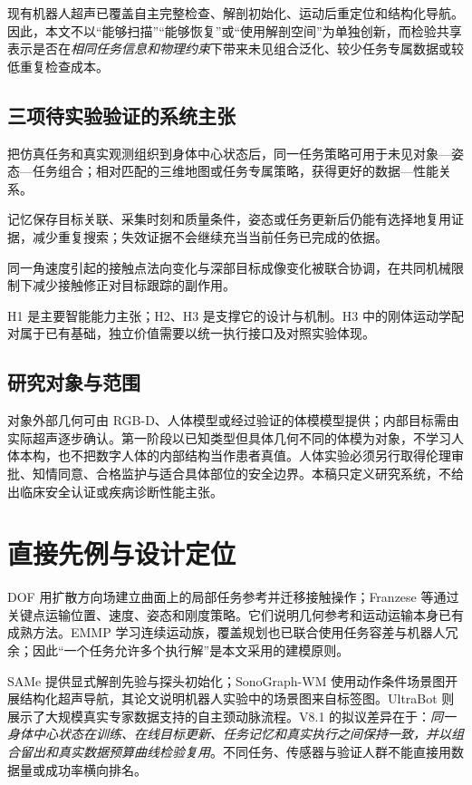 \documentclass[UTF8,11pt,a4paper,fontset=fandol]{ctexart}
\numberwithin{equation}{section}
\theoremstyle{definition}
\begin{document}
现有机器人超声已覆盖自主完整检查、解剖初始化、运动后重定位和结构化导航\cite{ultrabot,same,reposition,sonograph}。因此，本文不以“能够扫描”“能够恢复”或“使用解剖空间”为单独创新，而检验共享表示是否在\emph{相同任务信息和物理约束}下带来未见组合泛化、较少任务专属数据或较低重复检查成本。

\subsection{三项待实验验证的系统主张}
\begin{description}[style=nextline]
\item[H1：可迁移的共同接口。]
把仿真任务和真实观测组织到身体中心状态后，同一任务策略可用于未见对象—姿态—任务组合；相对匹配的三维地图或任务专属策略，获得更好的数据—性能关系。
\item[H2：可持续使用的对象证据。]
记忆保存目标关联、采集时刻和质量条件，姿态或任务更新后仍能有选择地复用证据，减少重复搜索；失效证据不会继续充当当前任务已完成的依据。
\item[H3：不牺牲目标成像的接触执行。]
同一角速度引起的接触点法向变化与深部目标成像变化被联合协调，在共同机械限制下减少接触修正对目标跟踪的副作用。
\end{description}
H1 是主要智能能力主张；H2、H3 是支撑它的设计与机制。H3 中的刚体运动学配对属于已有基础，独立价值需要以统一执行接口及对照实验体现。

\subsection{研究对象与范围}
对象外部几何可由 RGB-D、人体模型或经过验证的体模模型提供；内部目标需由实际超声逐步确认。第一阶段以已知类型但具体几何不同的体模为对象，不学习人体本构，也不把数字人体的内部结构当作患者真值。人体实验必须另行取得伦理审批、知情同意、合格监护与适合具体部位的安全边界。本稿只定义研究系统，不给出临床安全认证或疾病诊断性能主张。

\section{直接先例与设计定位}
\label{sec:related}
DOF 用扩散方向场建立曲面上的局部任务参考并迁移接触操作\cite{dof}；Franzese 等通过关键点运输位置、速度、姿态和刚度策略\cite{transport}。它们说明几何参考和运动运输本身已有成熟方法。EMMP 学习连续运动族，覆盖规划也已联合使用任务容差与机器人冗余\cite{emmp,coverageplan}；因此“一个任务允许多个执行解”是本文采用的建模原则。

SAMe 提供显式解剖先验与探头初始化；SonoGraph-WM 使用动作条件场景图开展结构化超声导航，其论文说明机器人实验中的场景图来自标签图\cite{same,sonograph}。UltraBot 则展示了大规模真实专家数据支持的自主颈动脉流程\cite{ultrabot}。V8.1 的拟议差异在于：\emph{同一身体中心状态在训练、在线目标更新、任务记忆和真实执行之间保持一致，并以组合留出和真实数据预算曲线检验复用}。不同任务、传感器与验证人群不能直接用数据量或成功率横向排名。
\end{document}
